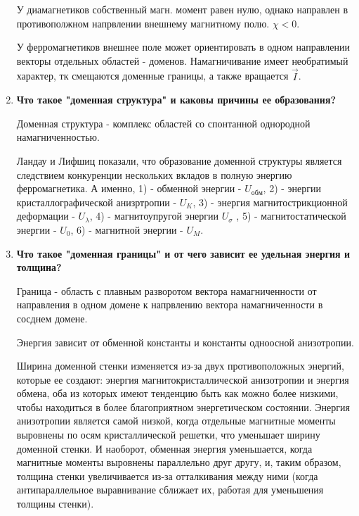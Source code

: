 \documentclass[a4paper]{article}
\begin{document}
\begin{enumerate}
    У диамагнетиков собственный магн. момент равен нулю, однако направлен в противополжном напрвлении внешнему магнитному полю. $\chi < 0$. \par 
    У ферромагнетиков внешнее поле может ориентировать в одном направлении векторы отдельных областей - доменов. Намагничивание имеет необратимый характер, тк смещаются доменные границы, а также вращается $\vec{I}$.   
    \item \textbf{Что такое "доменная структура" и каковы причины ее образования?}  \par 
    Доменная структура - комплекс областей со спонтанной однородной намагниченностью. \par 
    Ландау и Лифшиц показали, что образование доменной структуры является следствием конкуренции нескольких вкладов в полную энергию ферромагнетика. А именно, 1) - обменной энергии - $U_{обм}$, 2) - энергии кристаллографической анизртропии - $U_K$, 3) - энергия магнитострикционной деформации - $U_{\lambda}$, 4) - магнитоупругой энергии $U_{\sigma}$ , 5) - магнитостатической энергии - $U_0$, 6) - магнитной энергии - $U_M$.
    \item \textbf{Что такое "доменная границы" и от чего зависит ее удельная энергия и толщина?}  \par
        Граница - область с плавным разворотом вектора намагниченности от направления в одном домене к напрвлению вектора намагниченности в сосднем домене. \par 
        Энергия зависит от обменной константы и константы одноосной анизотропии. \par 
        Ширина доменной стенки изменяется из-за двух противоположных энергий, которые ее создают: энергия магнитокристаллической анизотропии и энергия обмена, оба из которых имеют тенденцию быть как можно более низкими, чтобы находиться в более благоприятном энергетическом состоянии. Энергия анизотропии является самой низкой, когда отдельные магнитные моменты выровнены по осям кристаллической решетки, что уменьшает ширину доменной стенки. И наоборот, обменная энергия уменьшается, когда магнитные моменты выровнены параллельно друг другу, и, таким образом, толщина стенки увеличивается из-за отталкивания между ними (когда антипараллельное выравнивание сближает их, работая для уменьшения толщины стенки).
\end{enumerate}
\end{document}
